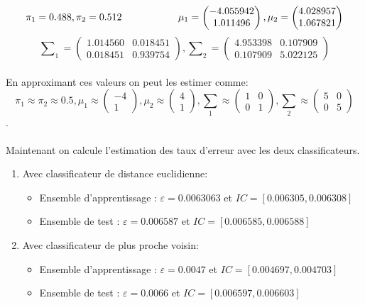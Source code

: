 \documentclass[a4paper,11pt]{article}
\begin{document}
  \[ \pi_1  = 0.488, \pi_2  = 0.512 \hspace*{2cm} 
    \mu_1  = \begin{pmatrix} -4.055942 \\ 1.011496 \end{pmatrix},
     \mu_2  = \begin{pmatrix} 4.028957 \\ 1.067821 \end{pmatrix}\]
  \[ \sum\nolimits_1 = \begin{pmatrix}
   1.014560  & 0.018451 \\
   0.018451 & 0.939754 
  \end{pmatrix},
  \sum\nolimits_2 = \begin{pmatrix}
  4.953398 & 0.107909 \\
  0.107909 & 5.022125 
  \end{pmatrix}\]\\

  En approximant ces valeurs on peut les estimer comme:
\[\pi_1 \approx  \pi_2 \approx   0.5,
  \mu_1 \approx  \begin{pmatrix} -4 \\ 1 \end{pmatrix}, \mu_2 \approx  \begin{pmatrix} 4 \\ 1 \end{pmatrix}
, \sum_1 \approx  \begin{pmatrix}
  1  & 0 \\
  0 & 1
  \end{pmatrix}
, \sum_2 \approx  \begin{pmatrix}
  5  & 0 \\
  0 & 5  
\end{pmatrix}\].\\\\  

Maintenant on calcule l'estimation des taux d'erreur avec les deux classificateurs.

\begin{enumerate}
  \item Avec classificateur de distance euclidienne:
  \begin{itemize}
    \item Ensemble d’apprentissage :  $\varepsilon = 0.0063063$ et $IC = [0.006305,0.006308]$
    \item Ensemble de test :  $\varepsilon = 0.006587$ et $IC = [0.006585,0.006588]$
  \end{itemize}
  \item Avec classificateur de plus proche voisin:
  \begin{itemize}
    \item Ensemble d’apprentissage :  $\varepsilon = 0.0047$ et $IC = [0.004697,0.004703]$
    \item Ensemble de test :  $\varepsilon = 0.0066$ et $IC = [0.006597,0.006603]$
  \end{itemize}
\end{enumerate}
\end{document}
